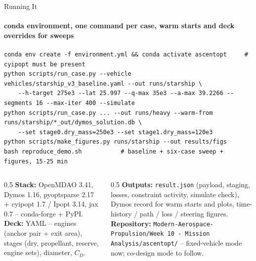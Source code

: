 \documentclass[aspectratio=169,10pt]{beamer}
\begin{document}
\begin{frame}[fragile]{Running It}
  \framesubtitle{conda environment, one command per case, warm starts and deck overrides for sweeps}
\begin{lstlisting}
conda env create -f environment.yml && conda activate ascentopt     # cyipopt must be present
python scripts/run_case.py --vehicle vehicles/starship_v3_baseline.yaml --out runs/starship \
    --h-target 275e3 --lat 25.997 --q-max 35e3 --a-max 39.2266 --segments 16 --max-iter 400 --simulate
python scripts/run_case.py ... --out runs/heavy --warm-from runs/starship/*_out/dymos_solution.db \
    --set stage0.dry_mass=250e3 --set stage1.dry_mass=120e3
python scripts/make_figures.py runs/starship --out results/figs
bash reproduce_demo.sh           # baseline + six-case sweep + figures, 15-25 min
\end{lstlisting}
  \begin{columns}[T]
    \begin{column}{0.5\textwidth}
      \footnotesize
      \textbf{Stack:} OpenMDAO 3.41, Dymos 1.16, pyoptsparse 2.17 + cyipopt 1.7 / Ipopt 3.14, jax 0.7 -- conda-forge + PyPI.\\
      \textbf{Deck:} YAML -- engines (anchor pair + exit area), stages (dry, propellant, reserve, engine sets), diameter, $C_D$.
    \end{column}
    \begin{column}{0.5\textwidth}
      \footnotesize
      \textbf{Outputs:} \texttt{result.json} (payload, staging, losses, constraint activity, simulate check), Dymos record for warm starts and plots, time-history / path / loss / steering figures.\\
      \textbf{Repository:} \texttt{Modern-Aerospace-Propulsion/Week 10 - Mission Analysis/ascentopt/} -- fixed-vehicle mode now; co-design mode to follow.
    \end{column}
  \end{columns}
\end{frame}
\end{document}

